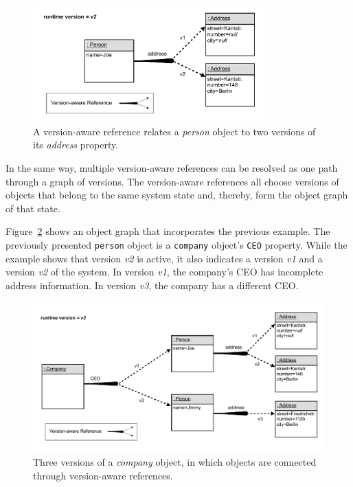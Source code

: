 \begin{figure}[h]
    \centering
    \includegraphics[width=0.8\textwidth]{figures/4_approach/5_versionAwareReferenceFollowingVersion2.pdf}
    \caption{A version-aware reference relates a \emph{person} object to two versions of its \emph{address} property.}
    \label{fig:VersionAwareReferenceFollowingVersion2}
\end{figure}

In the same way, multiple version-aware references can be resolved as one path through a graph of versions.
The version-aware references all choose versions of objects that belong to the same system state and, thereby, form the object graph of that state.

Figure~\ref{fig:ObjectGraphWithReferencesResolvedAlongVersion2} shows an object graph that incorporates the previous example.
The previously presented \lstinline{person} object is a \lstinline{company} object's \lstinline{CEO} property.
While the example shows that version \emph{v2} is active, it also indicates a version \emph{v1} and a version \emph{v2} of the system.
In version \emph{v1}, the company's CEO has incomplete address information.
In version \emph{v3}, the company has a different CEO.

\begin{figure}[h]
    \centering
    \includegraphics[width=\textwidth]{figures/4_approach/6_objectGraphWithVersonAwareReferences.pdf}
    \caption{Three versions of a \emph{company} object, in which objects are connected through version-aware references.}
    \label{fig:ObjectGraphWithReferencesResolvedAlongVersion2}
\end{figure}


